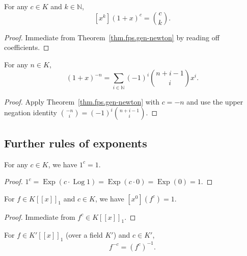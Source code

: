 \begin{corollary}
\label{cor.fps.coeff-one-add-X-fpsPow}
\leanhelper
\leanok
For any $c\in K$ and $k\in\mathbb{N}$,
\[
[x^k](1+x)^c = \binom{c}{k}.
\]
\end{corollary}

\begin{proof}
\leanok
Immediate from Theorem~\ref{thm.fps.gen-newton} by reading off coefficients.
\end{proof}

\begin{theorem}
\label{thm.fps.antiNewtonBinomial}
\leanhelper
\leanok
For any $n\in K$,
\[
(1+x)^{-n} = \sum_{i\in\mathbb{N}} (-1)^i \binom{n+i-1}{i} x^i.
\]
\end{theorem}

\begin{proof}
\leanok
Apply Theorem~\ref{thm.fps.gen-newton} with $c=-n$ and use the upper negation
identity $\binom{-n}{i} = (-1)^i\binom{n+i-1}{i}$.
\end{proof}

\subsection{Further rules of exponents}

\begin{lemma}
\label{lem.fps.one-fpsPow}
\leanhelper
\leanok
For any $c\in K$, we have $1^c = 1$.
\end{lemma}

\begin{proof}
\leanok
$1^c = \operatorname{Exp}(c\cdot\operatorname{Log}1) = \operatorname{Exp}(c\cdot 0) = \operatorname{Exp}(0) = 1$.
\end{proof}

\begin{lemma}
\label{lem.fps.constantCoeff-fpsPow}
\leanhelper
\leanok
For $f\in K[[x]]_1$ and $c\in K$, we have $[x^0](f^c) = 1$.
\end{lemma}

\begin{proof}
\leanok
Immediate from $f^c\in K[[x]]_1$.
\end{proof}

\begin{lemma}
\label{lem.fps.fpsPow-neg}
\leanhelper
\leanok
For $f\in K'[[x]]_1$ (over a field $K'$) and $c\in K'$,
\[
f^{-c} = (f^c)^{-1}.
\]
\end{lemma}

